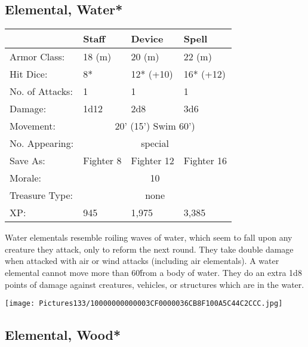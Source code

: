 \documentclass[a4paper,twoside,openany,10pt]{book}
\begin{document}
\begin{multicols}{2}
\subsection*{Elemental, Water*}\label{elemental-water}

\begin{tabularx}{0.48\textwidth}{@{}lllX@{}}
& Staff & Device & Spell \\\hline
Armor Class: & 18 (m) & 20 (m) & 22 (m) \\\hline
Hit Dice: & 8* & 12* (+10) & 16* (+12) \\\hline
No. of Attacks: & 1 & 1 & 1 \\\hline
Damage: & 1d12 & 2d8 & 3d6 \\\hline
Movement:  & \multicolumn{3}{c}{20' (15') Swim 60')}\\\hline
No. Appearing: &\multicolumn{3}{c}{special} \\\hline
Save As: & Fighter 8 & Fighter 12 & Fighter 16 \\\hline
Morale: & \multicolumn{3}{c}{10} \\\hline
Treasure Type: & \multicolumn{3}{c}{none} \\\hline
XP: & 945 & 1,975 & 3,385 \\\hline
\end{tabularx}\medskip

Water elementals resemble roiling waves of water, which seem to fall upon any creature they attack, only to reform the next round. They take double damage when attacked with air or wind attacks (including air elementals). A water elemental cannot move more than 60\' from a body of water. They do an extra 1d8 points of damage against creatures, vehicles, or structures which are in the water.


\begin{center}
	\texttt{[image: Pictures133/10000000000003CF0000036CB8F100A5C44C2CCC.jpg]}
\end{center}

\columnbreak

\subsection*{Elemental, Wood*}\label{elemental-wood}


\end{multicols}
\end{document}
